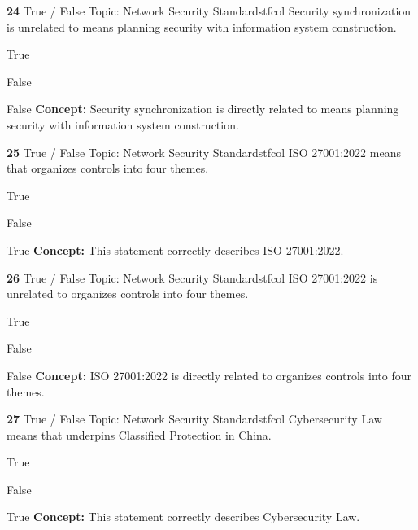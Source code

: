 \documentclass[10pt,a4paper]{article}
\begin{document}
\begin{qcard}{\color{white}\textbf{24} \hfill \small True / False \textbar{} Topic: Network Security Standards}{tfcol}
Security synchronization is unrelated to means planning security with information system construction.

\begin{qoptions}
\item True
\item False
\end{qoptions}
\begin{explainbox}{False}
\textbf{Concept:} Security synchronization is directly related to means planning security with information system construction.
\end{explainbox}
\end{qcard}

\begin{qcard}{\color{white}\textbf{25} \hfill \small True / False \textbar{} Topic: Network Security Standards}{tfcol}
ISO 27001:2022 means that organizes controls into four themes.

\begin{qoptions}
\item True
\item False
\end{qoptions}
\begin{explainbox}{True}
\textbf{Concept:} This statement correctly describes ISO 27001:2022.
\end{explainbox}
\end{qcard}

\begin{qcard}{\color{white}\textbf{26} \hfill \small True / False \textbar{} Topic: Network Security Standards}{tfcol}
ISO 27001:2022 is unrelated to organizes controls into four themes.

\begin{qoptions}
\item True
\item False
\end{qoptions}
\begin{explainbox}{False}
\textbf{Concept:} ISO 27001:2022 is directly related to organizes controls into four themes.
\end{explainbox}
\end{qcard}

\begin{qcard}{\color{white}\textbf{27} \hfill \small True / False \textbar{} Topic: Network Security Standards}{tfcol}
Cybersecurity Law means that underpins Classified Protection in China.

\begin{qoptions}
\item True
\item False
\end{qoptions}
\begin{explainbox}{True}
\textbf{Concept:} This statement correctly describes Cybersecurity Law.
\end{explainbox}
\end{qcard}
\end{document}
